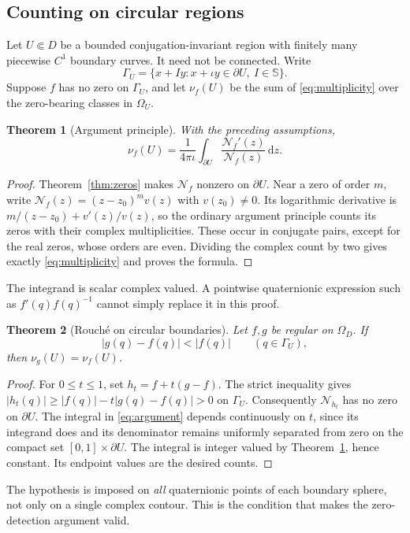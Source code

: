 \documentclass[11pt,a4paper]{article}
\numberwithin{equation}{section}
\newtheorem{theorem}{Theorem}[section]
\theoremstyle{definition}
\theoremstyle{remark}
\newcommand{\SSS}{\mathbb S}
\newcommand{\Norm}{\mathcal N}
\newcommand{\dd}{\,\mathrm d}
\begin{document}
\subsection{Counting on circular regions}
Let $U\Subset D$ be a bounded conjugation-invariant region with finitely many
piecewise $C^1$ boundary curves. It need not be connected. Write
\[
 \Gamma_U=\{x+Iy:x+\iota y\in\partial U,\ I\in\SSS\}.
\]
Suppose $f$ has no zero on $\Gamma_U$, and let $\nu_f(U)$ be the sum of
\eqref{eq:multiplicity} over the zero-bearing classes in $\Omega_U$.

\begin{theorem}[Argument principle]
\label{thm:argument}
With the preceding assumptions,
\begin{equation}
 \nu_f(U)=\frac1{4\pi\iota}
    \int_{\partial U}\frac{\Norm_f'(z)}{\Norm_f(z)}\dd z.
 \label{eq:argument}
\end{equation}
\end{theorem}
\begin{proof}
Theorem~\ref{thm:zeros} makes $\Norm_f$ nonzero on $\partial U$.
Near a zero of order $m$, write $\Norm_f(z)=(z-z_0)^m v(z)$ with
$v(z_0)\ne0$. Its logarithmic derivative is
$m/(z-z_0)+v'(z)/v(z)$, so the ordinary argument principle counts its zeros
with their complex multiplicities. These occur in conjugate pairs, except
for the real zeros, whose orders are even. Dividing the complex count by two
gives exactly \eqref{eq:multiplicity} and proves the formula.
\end{proof}
The integrand is scalar complex valued. A pointwise quaternionic expression
such as $f'(q)f(q)^{-1}$ cannot simply replace it in this proof.

\begin{theorem}[Rouch\'e on circular boundaries]
\label{thm:rouche}
Let $f,g$ be regular on $\Omega_D$. If
\begin{equation}
 |g(q)-f(q)|<|f(q)|\qquad(q\in\Gamma_U),
 \label{eq:rouche}
\end{equation}
then $\nu_g(U)=\nu_f(U)$.
\end{theorem}
\begin{proof}
For $0\le t\le1$, set $h_t=f+t(g-f)$. The strict inequality gives
$|h_t(q)|\ge|f(q)|-t|g(q)-f(q)|>0$ on $\Gamma_U$.
Consequently $\Norm_{h_t}$ has no zero on $\partial U$. The integral in
\eqref{eq:argument} depends continuously on $t$, since its integrand does and
its denominator remains uniformly separated from zero on the compact set
$[0,1]\times\partial U$. The integral is integer valued by
Theorem~\ref{thm:argument}, hence constant. Its endpoint values are the desired
counts.
\end{proof}
The hypothesis is imposed on \emph{all} quaternionic points of each boundary
sphere, not only on a single complex contour. This is the condition that
makes the zero-detection argument valid.
\end{document}
